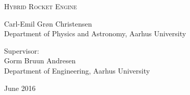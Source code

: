 
\begin{titlingpage}

\begin{center}

\vspace*{0cm}
\HUGE
\textsc{Hybrid Rocket Engine}\\
\vspace{1.5cm}

%
\vspace{1.2cm}

\large
{
    Carl-Emil Grøn Christensen\\
    Department of Physics and Astronomy, Aarhus University
}

\vspace{1.5cm}

{
  Supervisor:\\
  Gorm Bruun Andresen\\
  Department of Engineering, Aarhus University
}

\vspace{1.5cm}
{June 2016}\\


\end{center}



\end{titlingpage}
